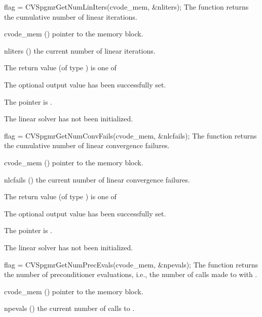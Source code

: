 {
  flag = CVSpgmrGetNumLinIters(cvode\_mem, \&nliters);
}
{
  The function  returns the
  cumulative number of linear iterations.
}
{
  \begin{args}
  \item[cvode\_mem] ()
    pointer to the {\cvodes} memory block.
  \item[nliters] ()
    the current number of linear iterations.
  \end{args}
}
{
  The return value  (of type ) is one of
  \begin{args}
  \item[\Id{CVSPGMR\_SUCCESS}] 
    The optional output value has been successfully set.
  \item[\Id{CVSPGMR\_MEM\_NULL}]
    The  pointer is .
  \item[\Id{CVSPGMR\_LMEM\_NULL}]
    The {\cvspgmr} linear solver has not been initialized.
  \end{args}
}
{}
{
  flag = CVSpgmrGetNumConvFails(cvode\_mem, \&nlcfails);
}
{
  The function  returns the
  cumulative number of linear convergence failures.
}
{
  \begin{args}
  \item[cvode\_mem] ()
    pointer to the {\cvodes} memory block.
  \item[nlcfails] ()
    the current number of linear convergence failures.
  \end{args}
}
{
  The return value  (of type ) is one of
  \begin{args}
  \item[\Id{CVSPGMR\_SUCCESS}] 
    The optional output value has been successfully set.
  \item[\Id{CVSPGMR\_MEM\_NULL}]
    The  pointer is .
  \item[\Id{CVSPGMR\_LMEM\_NULL}]
    The {\cvspgmr} linear solver has not been initialized.
  \end{args}
}
{}
{
  flag = CVSpgmrGetNumPrecEvals(cvode\_mem, \&npevals);
}
{
  The function  returns the
  number of preconditioner evaluations, i.e., the number of 
  calls made to  with .
}
{
  \begin{args}
  \item[cvode\_mem] ()
    pointer to the {\cvodes} memory block.
  \item[npevals] ()
    the current number of calls to .
  \end{args}
}
